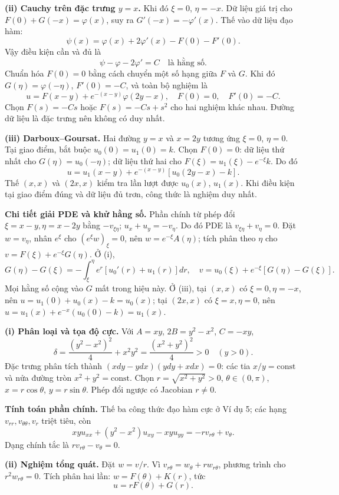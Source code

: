 \textbf{(ii) Cauchy trên đặc trưng $y=x$.} Khi đó $\xi=0$, $\eta=-x$. Dữ liệu giá trị cho $F(0)+G(-x)=\varphi(x)$, suy ra $G'(-x)=-\varphi'(x)$. Thế vào dữ liệu đạo hàm:
\[\psi(x)=\varphi(x)+2\varphi'(x)-F(0)-F'(0).\]
Vậy điều kiện cần và đủ là
\[\boxed{\psi-\varphi-2\varphi'=C\quad\text{là hằng số}.}\]
Chuẩn hóa $F(0)=0$ bằng cách chuyển một số hạng giữa $F$ và $G$. Khi đó $G(\eta)=\varphi(-\eta)$, $F'(0)=-C$, và toàn bộ nghiệm là
\[u=F(x-y)+e^{-(x-y)}\varphi(2y-x),\quad F(0)=0,\quad F'(0)=-C.\]
Chọn $F(s)=-Cs$ hoặc $F(s)=-Cs+s^2$ cho hai nghiệm khác nhau. Đường dữ liệu là đặc trưng nên không có duy nhất.

\textbf{(iii) Darboux--Goursat.} Hai đường $y=x$ và $x=2y$ tương ứng $\xi=0$, $\eta=0$. Tại giao điểm, bắt buộc $u_0(0)=u_1(0)=k$. Chọn $F(0)=0$: dữ liệu thứ nhất cho $G(\eta)=u_0(-\eta)$; dữ liệu thứ hai cho $F(\xi)=u_1(\xi)-e^{-\xi}k$. Do đó
\[\boxed{u=u_1(x-y)+e^{-(x-y)}[u_0(2y-x)-k].}\]
Thế $(x,x)$ và $(2x,x)$ kiểm tra lần lượt được $u_0(x)$, $u_1(x)$. Khi điều kiện tại giao điểm đúng và dữ liệu đủ trơn, công thức là nghiệm duy nhất.

\textbf{Chi tiết giải PDE và khử hằng số.} Phần chính từ phép đổi $\xi=x-y,\eta=x-2y$ bằng $-v_{\xi\eta}$; $u_x+u_y=-v_\eta$. Do đó PDE là $v_{\xi\eta}+v_\eta=0$. Đặt $w=v_\eta$, nhân $e^\xi$ cho $(e^\xi w)_\xi=0$, nên $w=e^{-\xi}A(\eta)$; tích phân theo $\eta$ cho $v=F(\xi)+e^{-\xi}G(\eta)$. Ở (i),
\[G(\eta)-G(\xi)=-\int_\xi^\eta e^r[u_0'(r)+u_1(r)]dr,\quad
v=u_0(\xi)+e^{-\xi}[G(\eta)-G(\xi)].\]
Mọi hằng số cộng vào $G$ mất trong hiệu này. Ở (iii), tại $(x,x)$ có $\xi=0,\eta=-x$, nên $u=u_1(0)+u_0(x)-k=u_0(x)$; tại $(2x,x)$ có $\xi=x,\eta=0$, nên $u=u_1(x)+e^{-x}(u_0(0)-k)=u_1(x)$.

\textbf{(i) Phân loại và tọa độ cực.} Với $A=xy$, $2B=y^2-x^2$, $C=-xy$,
\[\delta=\frac{(y^2-x^2)^2}{4}+x^2y^2=\frac{(x^2+y^2)^2}{4}>0\quad(y>0).\]
Đặc trưng phân tích thành $(xdy-ydx)(ydy+xdx)=0$: các tia $x/y=\mathrm{const}$ và nửa đường tròn $x^2+y^2=\mathrm{const}$. Chọn $r=\sqrt{x^2+y^2}>0$, $\theta\in(0,\pi)$, $x=r\cos\theta$, $y=r\sin\theta$. Phép đổi ngược có Jacobian $r\ne0$.

\textbf{Tính toán phần chính.} Thế ba công thức đạo hàm cực ở Ví dụ 5; các hạng $v_{rr},v_{\theta\theta},v_r$ triệt tiêu, còn
\[xyu_{xx}+(y^2-x^2)u_{xy}-xyu_{yy}=-r v_{r\theta}+v_\theta.\]
Dạng chính tắc là $r v_{r\theta}-v_\theta=0$.

\textbf{(ii) Nghiệm tổng quát.} Đặt $w=v/r$. Vì $v_{r\theta}=w_\theta+r w_{r\theta}$, phương trình cho $r^2w_{r\theta}=0$. Tích phân hai lần: $w=F(\theta)+K(r)$, tức
\[\boxed{u=rF(\theta)+G(r).}\]

